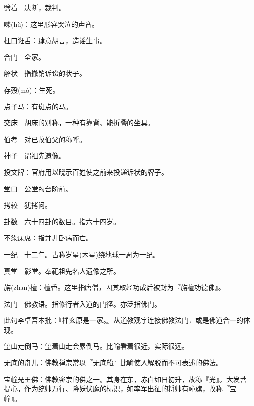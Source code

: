 \startbuffer[2462]
劈着：决断，裁判。
\stopbuffer


\startbuffer[2463]
嚛(hù)：这里形容哭泣的声音。
\stopbuffer


\startbuffer[2464]
枉口诳舌：肆意胡言，造谣生事。
\stopbuffer


\startbuffer[2465]
合门：全家。
\stopbuffer


\startbuffer[2466]
解状：指撤销诉讼的状子。
\stopbuffer


\startbuffer[2467]
存殁(mò)：生死。
\stopbuffer


\startbuffer[2468]
点子马：有斑点的马。
\stopbuffer


\startbuffer[2469]
交床：胡床的别称，一种有靠背、能折叠的坐具。
\stopbuffer


\startbuffer[2470]
伯考：对已故伯父的称呼。
\stopbuffer


\startbuffer[2471]
神子：谓祖先遗像。
\stopbuffer


\startbuffer[2472]
投文牌：官府用以晓示百姓使之前来投递诉状的牌子。
\stopbuffer


\startbuffer[2473]
堂口：公堂的台阶前。
\stopbuffer


\startbuffer[2474]
拷较：犹拷问。
\stopbuffer


\startbuffer[2475]
卦数：六十四卦的数目。指六十四岁。
\stopbuffer


\startbuffer[2476]
不染床席：指并非卧病而亡。
\stopbuffer


\startbuffer[2477]
一纪：十二年。古称岁星(木星)绕地球一周为一纪。
\stopbuffer


\startbuffer[2478]
真堂：影堂。奉祀祖先名人遗像之所。
\stopbuffer


\startbuffer[2479]
旃(zhān)檀：檀香。这里指唐僧，因其取经功成后被封为『旃檀功德佛』。
\stopbuffer


\startbuffer[2480]
法门：佛教语。指修行者入道的门径。亦泛指佛门。
\stopbuffer


\startbuffer[2481]
此句李卓吾本批：『禅玄原是一家。』从道教观宇连接佛教法门，或是佛道合一的体现。
\stopbuffer


\startbuffer[2482]
望山走倒马：望着山走会累倒马。比喻看着很近，实际很远。
\stopbuffer


\startbuffer[2483]
无底的舟儿：佛教禅宗常以『无底船』比喻使人解脱而不可表述的佛法。
\stopbuffer


\startbuffer[2484]
宝幢光王佛：佛教密宗的佛之一。其身在东，赤白如日初升，故称『光』。大发菩提心，作为统帅万行、降妖伏魔的标识，如率军出征的将帅有幢旗，故称『宝幢』。
\stopbuffer


